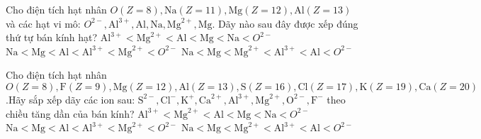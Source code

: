 \setcounter{ex}{25}
\begin{ex}
	Cho điện tích hạt nhân $O(Z=8), \mathrm{Na}(Z=11), \mathrm{Mg}(Z=12), \mathrm{Al}(Z=13)$ và các hạt vi mô: $O^{2-}, \mathrm{Al}^{3+}, \mathrm{Al}, \mathrm{Na}, \mathrm{Mg}^{2+}, \mathrm{Mg}$. Dãy nào sau đây được xếp đúng thứ tự bán kính hạt?
	{$\mathrm{Al}^{3+} < \mathrm{Mg}^{2+} < \mathrm{Al} < \mathrm{Mg} < \mathrm{Na} < O^{2-}$}
	{$\mathrm{Na} < \mathrm{Mg} < \mathrm{Al} < \mathrm{Al}^{3+} < \mathrm{Mg}^{2+} < O^{2-}$}
	{$\mathrm{Na} < \mathrm{Mg} < \mathrm{Mg}^{2+} < \mathrm{Al}^{3+} < \mathrm{Al} < O^{2-}$}
	\loigiai{}
\end{ex}
\begin{ex}
	Cho điện tích hạt nhân $O(Z=8), \mathrm{F}(Z=9), \mathrm{Mg}(Z=12), \mathrm{Al}(Z=13),\mathrm{S}(Z=16),\mathrm{Cl}(Z=17),\mathrm{K}(Z=19),\mathrm{Ca}(Z=20)$.Hãy sắp xếp dãy các ion sau: $\mathrm{S}^{2-},\mathrm{Cl}^{-},\mathrm{K}^{+},\mathrm{Ca}^{2+},\mathrm{Al}^{3+},\mathrm{Mg}^{2+},\mathrm{O}^{2-},\mathrm{F}^{-} $ theo chiều tăng dần của bán kính?
	{$\mathrm{Al}^{3+} < \mathrm{Mg}^{2+} < \mathrm{Al} < \mathrm{Mg} < \mathrm{Na} < O^{2-}$}
	{$\mathrm{Na} < \mathrm{Mg} < \mathrm{Al} < \mathrm{Al}^{3+} < \mathrm{Mg}^{2+} < O^{2-}$}
	{$\mathrm{Na} < \mathrm{Mg} < \mathrm{Mg}^{2+} < \mathrm{Al}^{3+} < \mathrm{Al} < O^{2-}$}
	\loigiai{}
\end{ex}
\label{\x}